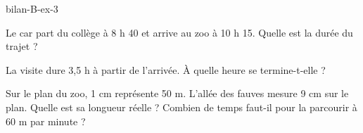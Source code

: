 \begin{blocEdition}{bilan-B-ex-3}
\begin{questions}
\item Le car part du collège à 8 h 40 et arrive au zoo à 10 h 15. Quelle est la durée du trajet ?
\item La visite dure 3,5 h à partir de l’arrivée. À quelle heure se termine-t-elle ?
\item Sur le plan du zoo, 1 cm représente 50 m. L’allée des fauves mesure 9 cm sur le plan. Quelle est sa longueur réelle ? Combien de temps faut-il pour la parcourir à 60 m par minute ?
\end{questions}\par{}\par\par{}\par{}\par{}\par{}\par{}\par{}
\end{blocEdition}
